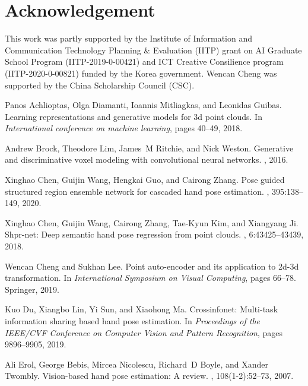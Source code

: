 \documentclass[10pt,twocolumn,letterpaper]{article}
\begin{document}
\section*{Acknowledgement}
\noindent
This work was partly supported by the Institute of Information and Communication Technology Planning \& Evaluation (IITP) grant on AI Graduate School Program (IITP-2019-0-00421) and ICT Creative Consilience program (IITP-2020-0-00821) funded by the Korea government. Wencan Cheng was supported by the China Scholarship Council (CSC).


\begin{thebibliography}{10}\itemsep=-1pt

Panos Achlioptas, Olga Diamanti, Ioannis Mitliagkas, and Leonidas Guibas.
\newblock Learning representations and generative models for 3d point clouds.
\newblock In {\em International conference on machine learning}, pages 40--49,
  2018.

Andrew Brock, Theodore Lim, James~M Ritchie, and Nick Weston.
\newblock Generative and discriminative voxel modeling with convolutional
  neural networks.
, 2016.

Xinghao Chen, Guijin Wang, Hengkai Guo, and Cairong Zhang.
\newblock Pose guided structured region ensemble network for cascaded hand pose
  estimation.
, 395:138--149, 2020.

Xinghao Chen, Guijin Wang, Cairong Zhang, Tae-Kyun Kim, and Xiangyang Ji.
\newblock Shpr-net: Deep semantic hand pose regression from point clouds.
, 6:43425--43439, 2018.

Wencan Cheng and Sukhan Lee.
\newblock Point auto-encoder and its application to 2d-3d transformation.
\newblock In {\em International Symposium on Visual Computing}, pages 66--78.
  Springer, 2019.

Kuo Du, Xiangbo Lin, Yi Sun, and Xiaohong Ma.
\newblock Crossinfonet: Multi-task information sharing based hand pose
  estimation.
\newblock In {\em Proceedings of the IEEE/CVF Conference on Computer Vision and
  Pattern Recognition}, pages 9896--9905, 2019.

Ali Erol, George Bebis, Mircea Nicolescu, Richard~D Boyle, and Xander Twombly.
\newblock Vision-based hand pose estimation: A review.
, 108(1-2):52--73, 2007.


\end{thebibliography}
\end{document}
